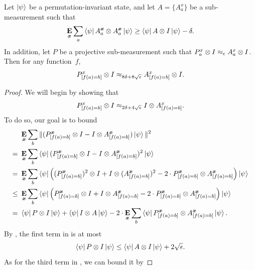 \begin{proposition}\label{prop:self-consistency-implies-data-processing}
Let $\ket{\psi}$ be a permutation-invariant state,
and let $A = \{A^x_a\}$ be a sub-measurement such that
\begin{equation*}
\mathop{\bf E\/}_{{\boldsymbol{x}}} \sum_a \bra{\psi} A^{{\boldsymbol{x}}}_a \otimes A^{{\boldsymbol{x}}}_a \ket{\psi} \geq  \bra{\psi} A \otimes I \ket{\psi} - \delta.
\end{equation*}
In addition, let $P$ be a projective sub-measurement such that $P^x_a \otimes I \approx_{\epsilon} A_a^x \otimes I$.
Then for any function~$f$,
\begin{equation*}
P^x_{[f(a)=b]} \otimes I \approx_{8\delta + 8\sqrt{\epsilon}} A_{[f(a)=b]}^x \otimes I.
\end{equation*}
\end{proposition}
\begin{proof}
We will begin by showing that
\begin{equation}\label{eq;what-we-want-to-prove-but-on-wrong-side}
P^x_{[f(a)=b]} \otimes I \approx_{2\delta + 4\sqrt{\epsilon}} I \otimes A_{[f(a)=b]}^x.
\end{equation}
To do so, our goal is to bound
\begin{align}
&\mathop{\bf E\/}_{{\boldsymbol{x}}} \sum_b \Vert(P^{{\boldsymbol{x}}}_{[f(a)=b]} \otimes I - I \otimes A_{[f(a)=b]}^{{\boldsymbol{x}}}) \ket{\psi} \Vert^2\nonumber\\
=~&\mathop{\bf E\/}_{{\boldsymbol{x}}} \sum_b \bra{\psi} (P^{{\boldsymbol{x}}}_{[f(a)=b]}  \otimes I -  I \otimes A_{[f(a)=b]}^{{\boldsymbol{x}}})^2 \ket{\psi} \nonumber\\
=~&\mathop{\bf E\/}_{{\boldsymbol{x}}} \sum_b \bra{\psi} \Big((P^{{\boldsymbol{x}}}_{[f(a)=b]})^2 \otimes I 
		+ I \otimes (A^{{\boldsymbol{x}}}_{[f(a)=b]})^2 
		- 2\cdot P^{{\boldsymbol{x}}}_{[f(a)=b]} \otimes A^{{\boldsymbol{x}}}_{[f(a)=b]}\Big) \ket{\psi}\nonumber\\
\leq~&\mathop{\bf E\/}_{{\boldsymbol{x}}} \sum_b \bra{\psi} \Big(P^{{\boldsymbol{x}}}_{[f(a)=b]} \otimes I 
		+ I \otimes A^{{\boldsymbol{x}}}_{[f(a)=b]}
		- 2\cdot P^{{\boldsymbol{x}}}_{[f(a)=b]} \otimes A^{{\boldsymbol{x}}}_{[f(a)=b]}\Big) \ket{\psi}\nonumber\\
=~&\bra{\psi} P \otimes I \ket{\psi} + \bra{\psi} I \otimes A \ket{\psi}
		- 2\cdot \mathop{\bf E\/}_{{\boldsymbol{x}}} \sum_b \bra{\psi}  P^{{\boldsymbol{x}}}_{[f(a)=b]} \otimes A^{{\boldsymbol{x}}}_{[f(a)=b]} \ket{\psi}.
				\label{eq:gonna-handle-third-term}
\end{align}
By , the first term in  is at most
\begin{equation*}
\bra{\psi} P \otimes I \ket{\psi}
\leq \bra{\psi} A \otimes I \ket{\psi} + 2\sqrt{\epsilon}.
\end{equation*}
As for the third term in , we can bound it by

\end{proof}
